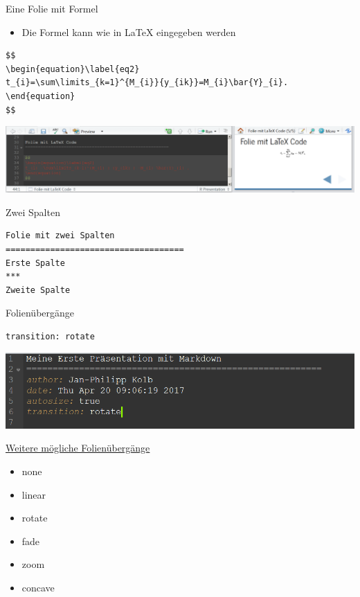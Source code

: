 \documentclass[ignorenonframetext,]{beamer}
\providecommand{\tightlist}{%
\setlength{\itemsep}{0pt}\setlength{\parskip}{0pt}}
\begin{document}
\begin{frame}[fragile]{Eine Folie mit Formel}

\begin{itemize}
\tightlist
\item
  Die Formel kann wie in LaTeX eingegeben werden
\end{itemize}

\begin{verbatim}
$$
\begin{equation}\label{eq2}
t_{i}=\sum\limits_{k=1}^{M_{i}}{y_{ik}}=M_{i}\bar{Y}_{i}. 
\end{equation}
$$
\end{verbatim}

\includegraphics{./tex2pdf.956/568b92eee2895bdd9bfe25ce2cd08fe39a8df5b6.png}

\end{frame}

\begin{frame}[fragile]{Zwei Spalten}

\begin{verbatim}
Folie mit zwei Spalten
====================================
Erste Spalte
***
Zweite Spalte
\end{verbatim}

\end{frame}

\begin{frame}[fragile]{Folienübergänge}

\begin{verbatim}
transition: rotate
\end{verbatim}

\includegraphics{./tex2pdf.956/74c996486e4976d782e91e8c7136e37e94ba589c.png}

\end{frame}

\begin{frame}{\href{https://support.rstudio.com/hc/en-us/articles/200714013-Slide-Transitions-and-Navigation}{Weitere
mögliche Folienübergänge}}

\begin{itemize}
\tightlist
\item
  none
\item
  linear
\item
  rotate
\item
  fade
\item
  zoom
\item
  concave
\end{itemize}

\end{frame}
\end{document}
